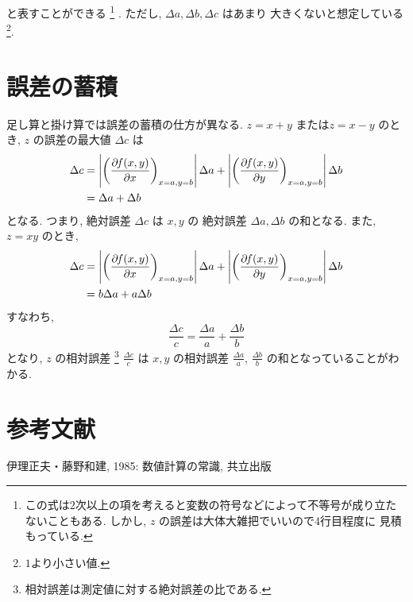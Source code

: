 ﻿\documentclass[report,]{dennou777}
\begin{document}
と表すことができる
\footnote{
	この式は$2$次以上の項を考えると変数の符号などによって不等号が成り立たないこともある. 
	しかし, $z$ の誤差は大体大雑把でいいので$4$行目程度に
	見積もっている.
}
. ただし, $\Delta a, \Delta b, \Delta c$ はあまり
大きくないと想定している
\footnote{
	$1$より小さい値.
}. 

\section*{誤差の蓄積}

足し算と掛け算では誤差の蓄積の仕方が異なる. 
$z = x + y$ または$z = x - y$ のとき, $z$ の誤差の最大値 $\Delta c$ は
\begin{align}
  \Delta c &= \left| \DP[][x=a,y=b]{f(x,y)}{x} \right|  \Delta a 
  + \left| \DP[][x=a,y=b]{f(x,y)}{y} \right| \Delta b \notag \\
  &= \Delta a + \Delta b
\end{align}
となる. つまり, 絶対誤差 $\Delta c$ は $x,y$ の
絶対誤差 $\Delta a, \Delta b$ の和となる. 
また, $z = xy$ のとき,
\begin{align*}
  \Delta c &= \left| \DP[][x=a,y=b]{f(x,y)}{x} \right| \Delta a 
  + \left| \DP[][x=a,y=b]{f(x,y)}{y} \right| \Delta b \\
  &= b \Delta a + a \Delta b 
\end{align*}
すなわち,
\begin{equation}
  \frac{\Delta c}{c} = \frac{\Delta a}{a} + \frac{\Delta b}{b}
\end{equation}
となり, $z$ の相対誤差
\footnote{
	相対誤差は測定値に対する絶対誤差の比である. 
} 
$\displaystyle\frac{\Delta c}{c}$ は $x,y$ の相対誤差 
$\displaystyle\frac{\Delta a}{a}$, 
$\displaystyle\frac{\Delta b}{b}$ の和となっていることがわかる. 

\section*{参考文献}
伊理正夫・藤野和建, 1985: 数値計算の常識, 共立出版
\end{document}
